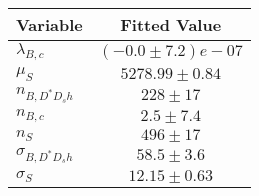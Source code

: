\begin{tabular}[t]{lc}
\hline
Variable &Fitted Value\\
\hline\hline
$\lambda_{B,c}$&$(-0.0\pm7.2)e-07$\\
\hline
$\mu_S$&$5278.99\pm0.84$\\
\hline
$n_{B, D^* D_s h}$&$228\pm17$\\
\hline
$n_{B,c}$&$2.5\pm7.4$\\
\hline
$n_S$&$496\pm17$\\
\hline
$\sigma_{B, D^* D_s h}$&$58.5\pm3.6$\\
\hline
$\sigma_S$&$12.15\pm0.63$\\
\hline
\end{tabular}